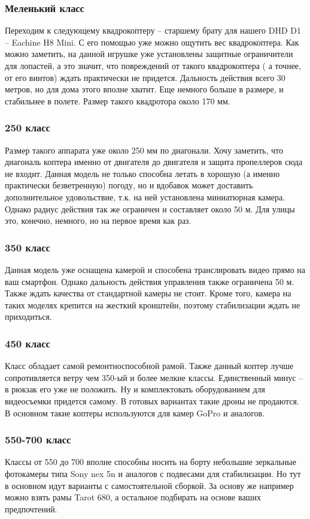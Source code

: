 \subsubsection{Меленький класс}
Переходим к следующему квадрокоптеру – старшему брату для нашего DHD D1 – Eachine H8 Mini. С его помощью уже можно ощутить вес квадрокоптера. Как можно заметить, на данной игрушке уже установлены защитные ограничители для лопастей, а это значит, что повреждений от такого квадрокоптера ( а точнее, от его винтов) ждать практически не придется. Дальность действия всего 30 метров, но для дома этого вполне хватит. Еще немного больше в размере, и стабильнее в полете. Размер такого квадротора около 170 мм.\cite{geek}
\subsubsection{250 класс}
Размер такого аппарата уже около 250 мм по диагонали. Хочу заметить, что диагональ коптера именно от двигателя до двигателя и защита пропеллеров сюда не входит. Данная модель не только способна летать в хорошую (а именно практически безветренную) погоду, но и вдобавок может доставить дополнительное удовольствие, т.к. на ней установлена миниатюрная камера. Однако радиус действия так же ограничен и составляет около 50 м. Для улицы это, конечно, немного, но на первое время как раз.\cite{geek}
\subsubsection{350 класс}
Данная модель уже оснащена камерой и способена транслировать видео прямо на ваш смартфон. Однако дальность действия управления также ограничена 50 м. Также ждать качества от стандартной камеры не стоит. Кроме того, камера на таких моделях крепится на жесткий кронштейн, поэтому стабилизации ждать не приходиться.\cite{geek}
\subsubsection{450 класс}
Класс обладает самой ремонтноспособной рамой. Также данный коптер лучше сопротивляется ветру чем 350-ый и более мелкие классы. Единственный минус – в рюкзак его уже не положить. Ну и комплектовать оборудованием для видеосъемки придется самому. В готовых вариантах такие дроны не продаются. В основном такие коптеры используются для камер GoPro и аналогов.\cite{geek}
\subsubsection{550-700 класс}
Классы от 550 до 700 вполне способны носить на борту небольшие зеркальные фотокамеры типа Sony nex 5n и аналогов с подвесами для стабилизации. Но тут в основном идут варианты с самостоятельной сборкой. За основу же например можно взять рамы Tarot 680, а остальное подбирать на основе ваших предпочтений.\cite{geek}

